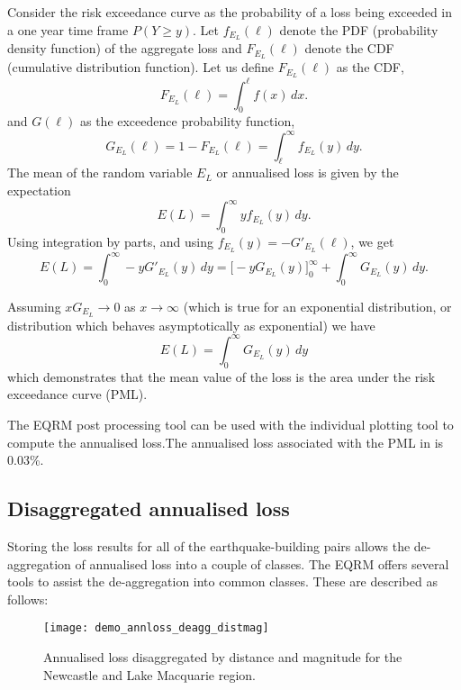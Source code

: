 Consider the risk exceedance curve as the probability of a loss
being exceeded in a one year time frame $P(Y \ge y)$. Let
$f_{E_L}(\ell)$ denote the PDF (probability density function) of
the aggregate loss and $F_{E_L}(\ell)$ denote the CDF (cumulative
distribution function). Let us define $F_{E_L}(\ell)$ as the CDF,
$$
 F_{E_L}(\ell) = \int_0^\ell f(x)\, dx.
$$
and $G(\ell)$ as the exceedence probability function,
$$
 G_{E_L}(\ell) = 1 - F_{E_L}(\ell) = \int_\ell^\infty f_{E_L}(y)\,dy.
$$
The mean of the random variable $E_L$ or annualised loss is given
by the expectation
$$
 E(L) = \int_0^\infty y f_{E_L}(y)\,dy.
$$
Using integration by parts, and using $f_{E_L}(y) =
-G'_{E_L}(\ell)$, we get
$$
 E(L) = \int_0^\infty -y G'_{E_L}(y)\,dy
      =  \big[ -yG_{E_L}(y)\big]_0^\infty + \int_0^\infty
      G_{E_L}(y)\,dy.
$$

Assuming $xG_{E_L}\to 0$ as $x\to\infty$ (which is true for an
exponential distribution, or distribution which behaves
asymptotically as exponential) we have
$$
 E(L) = \int_0^\infty G_{E_L}(y)\,dy
$$
which demonstrates that the mean value of the loss is the area
under the risk exceedance curve (PML).

The EQRM post processing tool  can
be used with the individual plotting tool
 to compute the annualised loss.The
annualised loss associated with the PML in  is
0.03\%.

\subsection{Disaggregated annualised loss}

Storing the loss results for all of the earthquake-building pairs
allows the de-aggregation of annualised loss into a couple of
classes. The EQRM offers several tools to assist the
de-aggregation into common classes. These
are described as follows:
\begin{figure}
\texttt{[image: demo\_annloss\_deagg\_distmag]}
 \caption{Annualised loss
disaggregated by distance and magnitude for the Newcastle and Lake
Macquarie region.} \label{fig-risk-deaggdistmag}
\end{figure}


